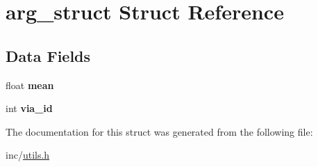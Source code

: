 \hypertarget{structarg__struct}{}\section{arg\+\_\+struct Struct Reference}
\label{structarg__struct}
\subsection*{Data Fields}
\begin{DoxyCompactItemize}
\item 
float {\bfseries mean}\hypertarget{structarg__struct_a976925cd66ff0dcd419628463f580f1c}{}\label{structarg__struct_a976925cd66ff0dcd419628463f580f1c}

\item 
int {\bfseries via\+\_\+id}\hypertarget{structarg__struct_adee5b1f14180dba9741de853530e309a}{}\label{structarg__struct_adee5b1f14180dba9741de853530e309a}

\end{DoxyCompactItemize}


The documentation for this struct was generated from the following file\+:\begin{DoxyCompactItemize}
\item 
inc/\hyperlink{utils_8h}{utils.\+h}\end{DoxyCompactItemize}
